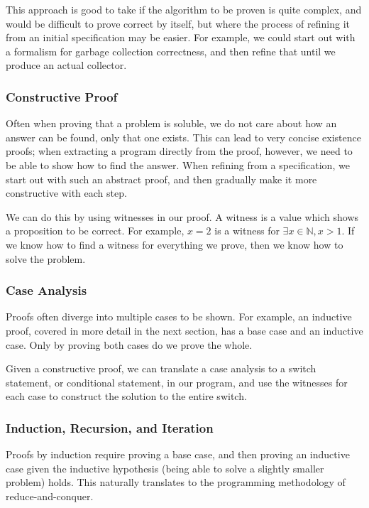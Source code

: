 This approach is good to take if the algorithm to be proven is quite
complex, and would be difficult to prove correct by itself, but where
the process of refining it from an initial specification may be
easier. For example, we could start out with a formalism for garbage
collection correctness, and then refine that until we produce an
actual collector.

\subsubsection{Constructive Proof}
\label{sec:lit-verification-extraction-constructive}

Often when proving that a problem is soluble, we do not care about how
an answer can be found, only that one exists. This can lead to very
concise existence proofs; when extracting a program directly from the
proof, however, we need to be able to show how to find the
answer. When refining from a specification, we start out with such an
abstract proof, and then gradually make it more constructive with each
step.

We can do this by using witnesses in our proof. A witness is a value
which shows a proposition to be correct. For example, $x = 2$ is a
witness for $\exists x \in \mathbb N, x > 1$. If we know how to find a
witness for everything we prove, then we know how to solve the
problem.

\subsubsection{Case Analysis}
\label{sec:lit-verification-extraction-cases}

Proofs often diverge into multiple cases to be shown. For example, an
inductive proof, covered in more detail in the next section, has a
base case and an inductive case. Only by proving both cases do we
prove the whole.

Given a constructive proof, we can translate a case analysis to a
switch statement, or conditional statement, in our program, and use
the witnesses for each case to construct the solution to the entire
switch.

\subsubsection{Induction, Recursion, and Iteration}
\label{sec:lit-verification-extraction-induction}

Proofs by induction require proving a base case, and then proving an
inductive case given the inductive hypothesis (being able to solve a
slightly smaller problem) holds. This naturally translates to the
programming methodology of reduce-and-conquer.

